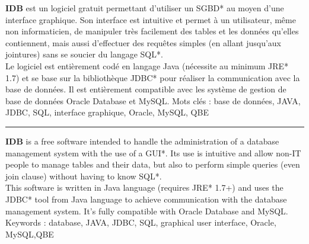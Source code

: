\textbf{IDB} est un logiciel gratuit permettant d'utiliser un SGBD* au moyen d'une interface graphique. Son interface est intuitive et permet à un utilisateur, même non informaticien, de manipuler très facilement des tables et les données qu'elles contiennent, mais aussi d'effectuer des requêtes simples (en allant jusqu'aux jointures) sans se soucier du langage SQL*.
\\
Le logiciel est entièrement codé en langage Java (nécessite au minimum JRE* 1.7) et se base sur la bibliothèque JDBC* pour réaliser la communication avec la base de données. Il est entièrement compatible avec les système de gestion de base de données Oracle Database et MySQL.
\bigbreak
Mots clés : base de données, JAVA, JDBC, SQL, interface graphique, Oracle, MySQL, QBE

\bigbreak
\rule{\linewidth}{0.4pt}
\bigbreak

\textbf{IDB} is a free software intended to handle the administration of a database management system with the use of a GUI*. Its use is intuitive and allow non-IT people to manage tables and their data, but also to perform simple queries (even join clause) without having to know SQL*.
\\
This software is written in Java language (requires JRE* 1.7+) and uses the JDBC* tool from Java language to achieve communication with the database management system. It's fully compatible with Oracle Database and MySQL.
\bigbreak
Keywords : database, JAVA, JDBC, SQL, graphical user interface, Oracle, MySQL,QBE
